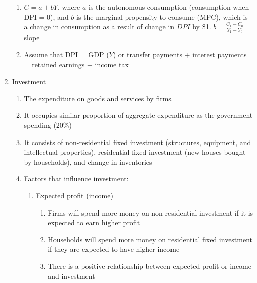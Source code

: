 \documentclass[12pt]{article}
\begin{document}
\begin{enumerate}
\begin{enumerate}
          \item $C = a+bY$, where $a$ is the autonomous consumption (consumption when DPI = 0), and $b$ is the marginal propensity to consume (MPC), which is a change in consumption as a result of change in $DPI$ by \$1. $b=\frac{C_1-C_0}{Y_1-Y_0}=$ slope

          \item Assume that DPI = GDP ($Y$) or transfer payments + interest payments = retained earnings + income tax

        \end{enumerate}

      \item Investment

        \begin{enumerate}

          \item The expenditure on goods and services by firms

          \item It occupies similar proportion of aggregate expenditure as the government spending (20\%)

          \item It consists of non-residential fixed investment (structures, equipment, and intellectual properties), residential fixed investment (new houses bought by households), and change in inventories

          \item Factors that influence investment:

            \begin{enumerate}

              \item Expected profit (income)

                \begin{enumerate}

                  \item Firms will spend more money on non-residential investment if it is expected to earn higher profit

                  \item Households will spend more money on residential fixed investment if they are expected to have higher income

                  \item There is a positive relationship between expected profit or income and investment

                \end{enumerate}


\end{enumerate}
\end{enumerate}
\end{enumerate}
\end{document}
